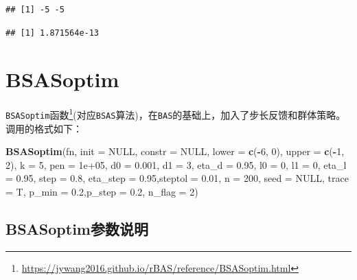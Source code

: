 \documentclass[]{ctexbook}
\newenvironment{Shaded}{\begin{snugshade}}{\end{snugshade}}
\newcommand{\KeywordTok}[1]{\textcolor[rgb]{0.13,0.29,0.53}{\textbf{#1}}}
\newcommand{\DataTypeTok}[1]{\textcolor[rgb]{0.13,0.29,0.53}{#1}}
\newcommand{\DecValTok}[1]{\textcolor[rgb]{0.00,0.00,0.81}{#1}}
\newcommand{\FloatTok}[1]{\textcolor[rgb]{0.00,0.00,0.81}{#1}}
\newcommand{\OtherTok}[1]{\textcolor[rgb]{0.56,0.35,0.01}{#1}}
\newcommand{\OperatorTok}[1]{\textcolor[rgb]{0.81,0.36,0.00}{\textbf{#1}}}
\newcommand{\NormalTok}[1]{#1}
\renewcommand{\href}[2]{#2\footnote{\url{#1}}}
\theoremstyle{definition}
\theoremstyle{definition}
\theoremstyle{definition}
\theoremstyle{remark}
\begin{document}
\begin{verbatim}
## [1] -5 -5
\end{verbatim}

\begin{verbatim}
## [1] 1.871564e-13
\end{verbatim}

\section{BSASoptim}\label{bsasoptim}

\href{https://jywang2016.github.io/rBAS/reference/BSASoptim.html}{\texttt{BSASoptim}函数}(对应\texttt{BSAS}算法)，在\texttt{BAS}的基础上，加入了步长反馈和群体策略。调用的格式如下：

\begin{Shaded}
\begin{Highlighting}[]
\KeywordTok{BSASoptim}\NormalTok{(fn, }
          \DataTypeTok{init =} \OtherTok{NULL}\NormalTok{, }\DataTypeTok{constr =} \OtherTok{NULL}\NormalTok{, }
          \DataTypeTok{lower =} \KeywordTok{c}\NormalTok{(}\OperatorTok{-}\DecValTok{6}\NormalTok{, }\DecValTok{0}\NormalTok{), }\DataTypeTok{upper =} \KeywordTok{c}\NormalTok{(}\OperatorTok{-}\DecValTok{1}\NormalTok{, }\DecValTok{2}\NormalTok{),}
          \DataTypeTok{k =} \DecValTok{5}\NormalTok{, }\DataTypeTok{pen =} \FloatTok{1e+05}\NormalTok{,}
          \DataTypeTok{d0 =} \FloatTok{0.001}\NormalTok{, }\DataTypeTok{d1 =} \DecValTok{3}\NormalTok{, }\DataTypeTok{eta_d =} \FloatTok{0.95}\NormalTok{,}
          \DataTypeTok{l0 =} \DecValTok{0}\NormalTok{, }\DataTypeTok{l1 =} \DecValTok{0}\NormalTok{, }\DataTypeTok{eta_l =} \FloatTok{0.95}\NormalTok{, }
          \DataTypeTok{step =} \FloatTok{0.8}\NormalTok{, }\DataTypeTok{eta_step =} \FloatTok{0.95}\NormalTok{,}\DataTypeTok{steptol =} \FloatTok{0.01}\NormalTok{,}
          \DataTypeTok{n =} \DecValTok{200}\NormalTok{, }\DataTypeTok{seed =} \OtherTok{NULL}\NormalTok{, }\DataTypeTok{trace =}\NormalTok{ T,  }
          \DataTypeTok{p_min =} \FloatTok{0.2}\NormalTok{,}\DataTypeTok{p_step =} \FloatTok{0.2}\NormalTok{, }\DataTypeTok{n_flag =} \DecValTok{2}\NormalTok{)}
\end{Highlighting}
\end{Shaded}

\subsection{BSASoptim参数说明}\label{BSASparms}
\end{document}
